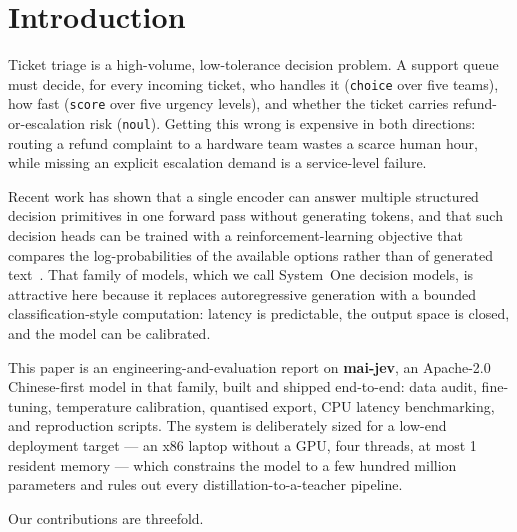 \documentclass[11pt,a4paper]{article}
\begin{document}
\section{Introduction}

Ticket triage is a high-volume, low-tolerance decision problem. A support queue must decide, for every incoming ticket, who handles it (\texttt{choice} over five teams), how fast (\texttt{score} over five urgency levels), and whether the ticket carries refund-or-escalation risk (\texttt{noul}). Getting this wrong is expensive in both directions: routing a refund complaint to a hardware team wastes a scarce human hour, while missing an explicit escalation demand is a service-level failure.

Recent work has shown that a single encoder can answer multiple structured decision primitives in one forward pass without generating tokens, and that such decision heads can be trained with a reinforcement-learning objective that compares the log-probabilities of the available options rather than of generated text~\cite{laya}. That family of models, which we call System~One decision models, is attractive here because it replaces autoregressive generation with a bounded classification-style computation: latency is predictable, the output space is closed, and the model can be calibrated.

This paper is an engineering-and-evaluation report on \textbf{mai-jev}, an Apache-2.0 Chinese-first model in that family, built and shipped end-to-end: data audit, fine-tuning, temperature calibration, quantised export, CPU latency benchmarking, and reproduction scripts. The system is deliberately sized for a low-end deployment target --- an x86 laptop without a GPU, four threads, at most \SI{1}{\giga\byte} resident memory --- which constrains the model to a few hundred million parameters and rules out every distillation-to-a-teacher pipeline.

Our contributions are threefold.
\end{document}
